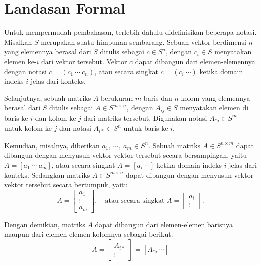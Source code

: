 \section{Landasan Formal}

Untuk mempermudah pembahasan, terlebih dahulu didefinisikan beberapa notasi. Misalkan \(S\) merupakan suatu himpunan sembarang. Sebuah vektor berdimensi \(n\) yang elemennya berasal dari \(S\) ditulis sebagai \(c \in S^n\), dengan \(c_i \in S\) menyatakan elemen ke-\(i\) dari vektor tersebut. Vektor \(c\) dapat dibangun dari elemen-elemennya dengan notasi \(c = (c_1\ \cdots\ c_n)\), atau secara singkat \(c = (c_i\ \cdots)\) ketika domain indeks \(i\) jelas dari konteks.

Selanjutnya, sebuah matriks \(A\) berukuran \(m\) baris dan \(n\) kolom yang elemennya berasal dari \(S\) ditulis sebagai \(A \in S^{m\times n}\), dengan \(A_{ij} \in S\) menyatakan elemen di baris ke-\(i\) dan kolom ke-\(j\) dari matriks tersebut. Digunakan notasi \(A_{*j} \in S^m\) untuk kolom ke-\(j\) dan notasi \(A_{i*} \in S^n\) untuk baris ke-\(i\).

Kemudian, misalnya, diberikan \(a_1,\ \cdots,\ a_m \in S^n\). Sebuah matriks \(A \in S^{n\times m}\) dapat dibangun dengan menyusun vektor-vektor tersebut secara bersampingan, yaitu \(A = [a_1\ \cdots\ a_m]\), atau secara singkat \(A = [a_i\ \cdots]\) ketika domain indeks \(i\) jelas dari konteks. Sedangkan matriks \(A \in S^{m\times n}\) dapat dibangun dengan menyusun vektor-vektor tersebut secara bertumpuk, yaitu
	\[ A = \left[ \begin{array}{c} a_1\\ \vdots\\ a_m \end{array} \right], \quad \text{atau secara singkat } A = \left[ \begin{array}{c} a_i\\ \vdots \end{array} \right] \text{.}\]

Dengan demikian, matriks \(A\) dapat dibangun dari elemen-elemen barisnya maupun dari elemen-elemen kolomnya sebagai berikut.
	\[ A = \left[ \begin{array}{c} A_{i*}\\ \vdots \end{array} \right] = [A_{*j}\ \cdots] \]

